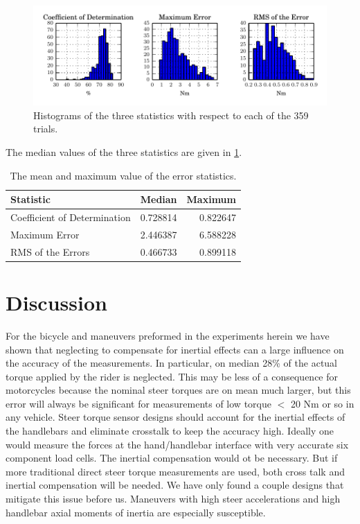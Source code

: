 \documentclass[a4paper]{article}
\begin{document}
\begin{figure}
  \label{fig:error-stats}
  \centering
  \caption{Histograms of the three statistics with respect to each of the 359
    trials.}
  \includegraphics{figures/error-stats.pdf}
\end{figure}

The median values of the three statistics are given in \ref{tab:medians}.

\begin{table}
  \caption{The mean and maximum value of the error statistics.}
  \centering
  \begin{tabular}{lrr}
    \hline
    Statistic                    & Median   & Maximum \\
    \hline
    Coefficient of Determination & 0.728814 & 0.822647 \\
    Maximum Error                & 2.446387 & 6.588228 \\
    RMS of the Errors            & 0.466733 & 0.899118
  \end{tabular}
  \label{tab:medians}
\end{table}

\section*{Discussion}

For the bicycle and maneuvers preformed in the experiments herein we have shown
that neglecting to compensate for inertial effects can a large influence on the
accuracy of the measurements. In particular, on median 28\% of the actual
torque applied by the rider is neglected. This may be less of a consequence for
motorcycles because the nominal steer torques are on mean much larger, but this
error will always be significant for measurements of low torque $<$ 20 Nm or so
in any vehicle. Steer torque sensor designs should account for the inertial
effects of the handlebars and eliminate crosstalk to keep the accuracy high.
Ideally one would measure the forces at the hand/handlebar interface with very
accurate six component load cells. The inertial compensation would ot be
necessary. But if more traditional direct steer torque measurements are used,
both cross talk and inertial compensation will be needed. We have only found a
couple designs that mitigate this issue before us. Maneuvers with high steer
accelerations and high handlebar axial moments of inertia are especially
susceptible.
\end{document}

